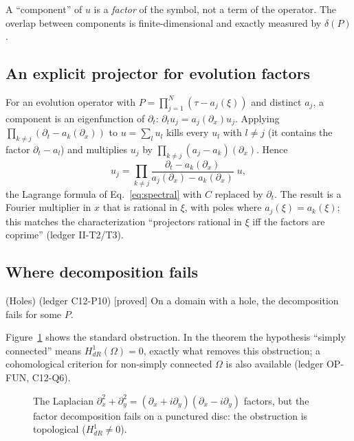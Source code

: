 \documentclass[11pt,a4paper]{article}
\theoremstyle{definition}
\newcommand{\badge}[2]{\textcolor{#1}{\textsf{\footnotesize[#2]}}}
\newcommand{\proved}[1][]{\badge{cC}{proved#1}}
\newcommand{\led}[1]{\textcolor{cG}{\textsf{\footnotesize(ledger #1)}}}
\begin{document}
\begin{takeaway}
A ``component'' of $u$ is a \emph{factor} of the symbol, not a term of the operator. The overlap between components is finite-dimensional and exactly measured by $\delta(P)$.
\end{takeaway}

\subsection{An explicit projector for evolution factors}
For an evolution operator with $P=\prod_{j=1}^N(\tau-a_j(\xi))$ and distinct $a_j$, a component is an eigenfunction of $\partial_t$: $\partial_tu_j=a_j(\partial_x)u_j$. Applying $\prod_{k\ne j}(\partial_t-a_k(\partial_x))$ to $u=\sum_lu_l$ kills every $u_l$ with $l\ne j$ (it contains the factor $\partial_t-a_l$) and multiplies $u_j$ by $\prod_{k\ne j}(a_j-a_k)(\partial_x)$. Hence
\begin{equation}\label{eq:lagrange}
u_j=\prod_{k\ne j}\frac{\partial_t-a_k(\partial_x)}{a_j(\partial_x)-a_k(\partial_x)}\;u ,
\end{equation}
the Lagrange formula of Eq.~\eqref{eq:spectral} with $C$ replaced by $\partial_t$. The result is a Fourier multiplier in $x$ that is rational in $\xi$, with poles where $a_j(\xi)=a_k(\xi)$; this matches the characterization ``projectors rational in $\xi$ iff the factors are coprime'' \led{II-T2/T3}.

\subsection{Where decomposition fails}
\begin{proposition}{(Holes) \led{C12-P10} \proved[]}
On a domain with a hole, the decomposition fails for some $P$.
\end{proposition}
Figure~\ref{fig:hole} shows the standard obstruction. In the theorem the hypothesis ``simply connected'' means $H^1_{dR}(\Omega)=0$, exactly what removes this obstruction; a cohomological criterion for non-simply connected $\Omega$ is also available \led{OP-FUN, C12-Q6}.
\begin{figure}[!htb]
\centering
{}
\caption{The Laplacian $\partial_x^2+\partial_y^2=(\partial_x+i\partial_y)(\partial_x-i\partial_y)$ factors, but the factor decomposition fails on a punctured disc: the obstruction is topological ($H^1_{dR}\neq0$).}\label{fig:hole}
\end{figure}
\end{document}
